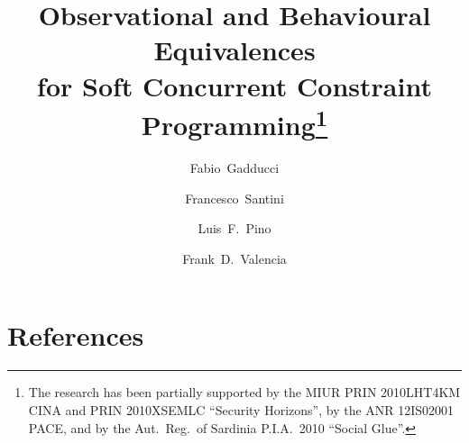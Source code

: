 \documentclass[preprint,12pt]{elsarticle}
\begin{document}
\begin{frontmatter}
\title{Observational and Behavioural Equivalences\\ for 
Soft Concurrent Constraint Programming\thanks{The research 
has been partially supported 
by the MIUR PRIN 2010LHT4KM CINA
and PRIN 2010XSEMLC ``Security Horizons'',
by the ANR 12IS02001 PACE, and 
by the Aut.\ Reg.\ of Sardinia P.I.A.\ 2010 ``Social Glue''.
}
}

\author[fb]{Fabio~Gadducci}
    \author[fs]{Francesco~Santini}
    \author[lp]{Luis~F.~Pino}
    \author[fv]{Frank~D.~Valencia}
 


\address[fb]{Dipartimento di Informatica, Universit\`a di Pisa, Italy} 
\address[fs]{Dipartimento di Matematica e Informatica, Universit\`a di Perugia, Italy}
\address[lp]{Dipartimento di Matematica e Informatica, Universit\`a di Cagliari, Italy}
\address[fv]{CNRS and LIX, \'{E}cole Polytechnique de Paris, France}

   
    

\end{frontmatter}






%




\section*{References} \label{}



%
\end{document}
